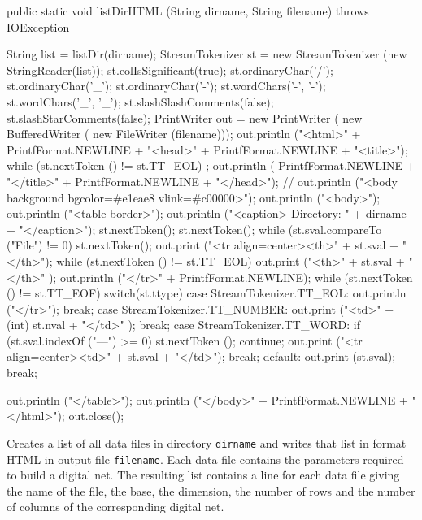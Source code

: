 \begin{code}

   public static void listDirHTML (String dirname, String filename)
          throws IOException \begin{hide} {
      String list = listDir(dirname);
      StreamTokenizer st = new StreamTokenizer (new StringReader(list));
      st.eolIsSignificant(true);
      st.ordinaryChar('/');
      st.ordinaryChar('_');
      st.ordinaryChar('-');
      st.wordChars('-', '-');
      st.wordChars('_', '_');
      st.slashSlashComments(false);
      st.slashStarComments(false);
      PrintWriter out = new PrintWriter (
                            new BufferedWriter (
                               new FileWriter (filename)));
      out.println ("<html>" + PrintfFormat.NEWLINE +
          "<head>" + PrintfFormat.NEWLINE + "<title>");
      while (st.nextToken () != st.TT_EOL)
         ;
      out.println ( PrintfFormat.NEWLINE + "</title>" +
           PrintfFormat.NEWLINE + "</head>");
//      out.println ("<body background bgcolor=#e1eae8 vlink=#c00000>");
      out.println ("<body>");
      out.println ("<table border>");
      out.println ("<caption> Directory: " + dirname + "</caption>");
      st.nextToken(); st.nextToken();
      while (st.sval.compareTo ("File") != 0)
         st.nextToken();
      out.print ("<tr align=center><th>" + st.sval + "</th>");
      while (st.nextToken () != st.TT_EOL) {
         out.print ("<th>" + st.sval + "</th>" );
      }
      out.println ("</tr>" + PrintfFormat.NEWLINE);
      while (st.nextToken () != st.TT_EOF) {
          switch(st.ttype) {
          case StreamTokenizer.TT_EOL:
             out.println ("</tr>");
             break;
          case StreamTokenizer.TT_NUMBER:
             out.print ("<td>" + (int) st.nval + "</td>" );
             break;
          case StreamTokenizer.TT_WORD:
             if (st.sval.indexOf ("---") >= 0) {
                st.nextToken ();
                continue;
             }
             out.print ("<tr align=center><td>" + st.sval + "</td>");
             break;
          default:
             out.print (st.sval);
             break;
        }
      }

      out.println ("</table>");
      out.println ("</body>" + PrintfFormat.NEWLINE + "</html>");
      out.close();
}\end{hide}
\end{code}
\begin{tabb}
 Creates a list of all data files in directory \texttt{dirname} and writes
that list in format HTML in output file \texttt{filename}.
Each data file contains the parameters required to build a digital net.
The resulting list contains a line for each data file giving the
name of the file, the base, the dimension, the number of rows and
the number of columns of the corresponding digital net.
 \end{tabb}
\begin{code}
\begin{hide}
}
\end{hide}
\end{code}
